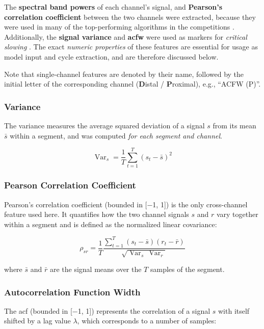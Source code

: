 The \textbf{spectral band powers} of each channel's signal, and \textbf{Pearson's correlation coefficient} between the two channels were extracted, because they were used in many of the top-performing algorithms in the competitions \parencite{brinkmann_crowdsourcing_2016, muller_coherent_2022, kuhlmann_epilepsyecosystemorg_2018}.
Additionally, the \textbf{signal variance} and \textbf{\gls{acfw}} were used as markers for \textit{critical slowing} \parencite{maturana_critical_2020}.
The exact \textit{numeric properties} of these features are essential for usage as model input and cycle extraction, and are therefore discussed below.

Note that single-channel features are denoted by their name, followed by the initial letter of the corresponding channel (\textbf{D}istal / \textbf{P}roximal), e.g., \enquote{ACFW (P)}.

\subsubsection{Variance}
The variance measures the average squared deviation of a signal $s$ from its mean $\bar{s}$ within a segment, and was computed \textit{for each segment and channel}.

\begin{equation}
    \label{eq:variance}
    \operatorname{Var}_s = \frac{1}{T} \sum_{t=1}^{T} \left(s_t-\bar{s}\right)^2
\end{equation}

\subsubsection{Pearson Correlation Coefficient}
Pearson's correlation coefficient (bounded in [\num{-1}, \num{1}]) is the only cross-channel feature used here.
It quantifies how the two channel signals $s$ and $r$ vary together within a segment and is defined as the normalized linear covariance:

\begin{equation}
    \label{eq:pearson-correlation}
    \rho_{sr} =
    \frac{1}{T}
    \frac{\sum_{t=1}^{T} \left(s_t-\bar{s}\right)\left(r_t-\bar{r}\right)}{\sqrt{\operatorname{Var}_s\,\operatorname{Var}_r}}
\end{equation}

where $\bar{s}$ and $\bar{r}$ are the signal means over the $T$ samples of the segment.

\subsubsection{Autocorrelation Function Width}
The \gls{acf} (bounded in [\num{-1}, \num{1}]) represents the correlation of a signal $s$ with itself shifted by a lag value $\lambda$, which corresponds to a number of samples:

